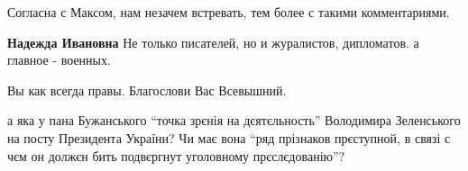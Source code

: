 \begin{itemize}
\begin{itemize}
Согласна с Максом, нам незачем встревать, тем более с такими комментариями.

\textbf{Надежда Ивановна} Не только писателей, но и журалистов, дипломатов. а главное - военных.

Вы как всегда правы. Благослови Вас Всевышний.
\end{itemize} %


а яка у пана Бужанського \enquote{точка зрєнія на дєятєльность} Володимира Зеленського
на посту Президента України? Чи має вона \enquote{ряд прізнаков прєступной, в связі с
чєм он должєн бить подвєргнут уголовному прєслєдованію}?

\end{itemize} %
